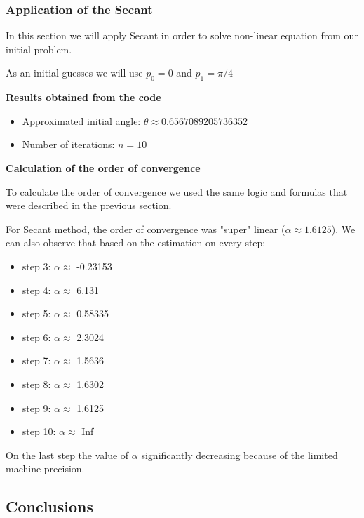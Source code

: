 \documentclass{article}
\begin{document}
\subsubsection{Application of the Secant}

In this section we will apply Secant in order to solve non-linear equation from our initial problem.

As an initial guesses we will use $p_0 = 0$ and $p_1 = \pi/4$

\vspace{5pt}
\noindent \textbf{Results obtained from the code}
\begin{itemize}
    \item Approximated initial angle: $\theta \approx 0.6567089205736352$
    \item Number of iterations: $n = 10$
\end{itemize}

\vspace{5pt}
\noindent \textbf{Calculation of the order of convergence}

To calculate the order of convergence we used the same logic and formulas that were described in the previous section.

For Secant method, the order of convergence was "super" linear ($\alpha \approx 1.6125$). We can also observe that based on the estimation on every step:

\begin{itemize}
    \item step 3: $\alpha \approx$ -0.23153
    \item step 4: $\alpha \approx$ 6.131
    \item step 5: $\alpha \approx$ 0.58335
    \item step 6: $\alpha \approx$ 2.3024
    \item step 7: $\alpha \approx$ 1.5636
    \item step 8: $\alpha \approx$ 1.6302
    \item step 9: $\alpha \approx$ 1.6125
    \item step 10: $\alpha \approx$ Inf
\end{itemize}

On the last step the value of $\alpha$ significantly decreasing because of the limited machine precision.

\subsection{Conclusions}
\end{document}
